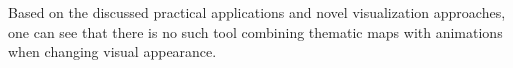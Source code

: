 Based on the discussed practical applications and novel visualization approaches, one can see that there is no such tool combining thematic maps with animations when changing visual appearance.